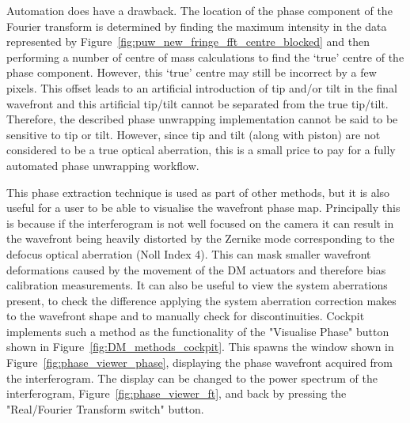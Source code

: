 Automation does have a drawback. The location of the phase component of the Fourier transform is determined by finding the maximum intensity in the data represented by Figure~\ref{fig:puw_new_fringe_fft_centre_blocked} and then performing a number of centre of mass calculations to find the `true' centre of the phase component. However, this `true' centre may still be incorrect by a few pixels. This offset leads to an artificial introduction of tip and/or tilt in the final wavefront and this artificial tip/tilt cannot be separated from the true tip/tilt. Therefore, the described phase unwrapping implementation cannot be said to be sensitive to tip or tilt. However, since tip and tilt (along with piston) are not considered to be a true optical aberration, this is a small price to pay for a fully automated phase unwrapping workflow.

This phase extraction technique is used as part of other methods, but it is also useful for a user to be able to visualise the wavefront phase map. Principally this is because if the interferogram is not well focused on the camera it can result in the wavefront being heavily distorted by the Zernike mode corresponding to the defocus optical aberration (Noll Index 4). This can mask smaller wavefront deformations caused by the movement of the DM actuators and therefore bias calibration measurements. It can also be useful to view the system aberrations present, to check the difference applying the system aberration correction makes to the wavefront shape and to manually check for discontinuities. Cockpit implements such a method as the functionality of the "Visualise Phase" button shown in Figure~\ref{fig:DM_methods_cockpit}. This spawns the window shown in Figure~\ref{fig:phase_viewer_phase}, displaying the phase wavefront acquired from the interferogram. The display can be changed to the power spectrum of the interferogram, Figure~\ref{fig:phase_viewer_ft}, and back by pressing the "Real/Fourier Transform switch" button. 

